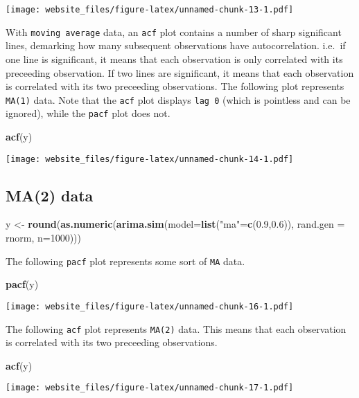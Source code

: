 \documentclass[]{book}
\newenvironment{Shaded}{\begin{snugshade}}{\end{snugshade}}
\newcommand{\KeywordTok}[1]{\textcolor[rgb]{0.13,0.29,0.53}{\textbf{#1}}}
\newcommand{\DataTypeTok}[1]{\textcolor[rgb]{0.13,0.29,0.53}{#1}}
\newcommand{\DecValTok}[1]{\textcolor[rgb]{0.00,0.00,0.81}{#1}}
\newcommand{\FloatTok}[1]{\textcolor[rgb]{0.00,0.00,0.81}{#1}}
\newcommand{\StringTok}[1]{\textcolor[rgb]{0.31,0.60,0.02}{#1}}
\newcommand{\NormalTok}[1]{#1}
\begin{document}
\texttt{[image: website\_files/figure-latex/unnamed-chunk-13-1.pdf]}

\newpage

With \texttt{moving\ average} data, an \texttt{acf} plot contains a
number of sharp significant lines, demarking how many subsequent
observations have autocorrelation. i.e.~if one line is significant, it
means that each observation is only correlated with its preceeding
observation. If two lines are significant, it means that each
observation is correlated with its two preceeding observations. The
following plot represents \texttt{MA(1)} data. Note that the
\texttt{acf} plot displays \texttt{lag\ 0} (which is pointless and can
be ignored), while the \texttt{pacf} plot does not.

\begin{Shaded}
\begin{Highlighting}[]
\KeywordTok{acf}\NormalTok{(y)}
\end{Highlighting}
\end{Shaded}

\texttt{[image: website\_files/figure-latex/unnamed-chunk-14-1.pdf]}

\newpage 

\subsection{MA(2) data}\label{ma2-data}

\begin{Shaded}
\begin{Highlighting}[]
\NormalTok{y <-}\StringTok{ }\KeywordTok{round}\NormalTok{(}\KeywordTok{as.numeric}\NormalTok{(}\KeywordTok{arima.sim}\NormalTok{(}\DataTypeTok{model=}\KeywordTok{list}\NormalTok{(}\StringTok{"ma"}\NormalTok{=}\KeywordTok{c}\NormalTok{(}\FloatTok{0.9}\NormalTok{,}\FloatTok{0.6}\NormalTok{)), }\DataTypeTok{rand.gen =}\NormalTok{ rnorm, }\DataTypeTok{n=}\DecValTok{1000}\NormalTok{)))}
\end{Highlighting}
\end{Shaded}

The following \texttt{pacf} plot represents some sort of \texttt{MA}
data.

\begin{Shaded}
\begin{Highlighting}[]
\KeywordTok{pacf}\NormalTok{(y)}
\end{Highlighting}
\end{Shaded}

\texttt{[image: website\_files/figure-latex/unnamed-chunk-16-1.pdf]}

\newpage

The following \texttt{acf} plot represents \texttt{MA(2)} data. This
means that each observation is correlated with its two preceeding
observations.

\begin{Shaded}
\begin{Highlighting}[]
\KeywordTok{acf}\NormalTok{(y)}
\end{Highlighting}
\end{Shaded}

\texttt{[image: website\_files/figure-latex/unnamed-chunk-17-1.pdf]}


\end{document}
